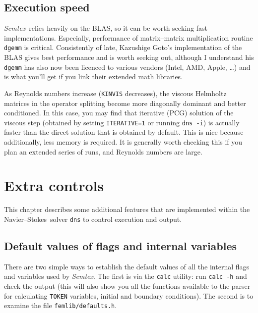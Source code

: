 \documentclass[11pt]{report}
\newcommand{\Semtex}{\emph{Semtex}} \newcommand{\Dog}{\emph{Dog}}
\newcommand\NavSto{Navier--Stokes}
\begin{document}
\section{Execution speed}
\label{sec.speed}

\Semtex\ relies heavily on the BLAS, so it can be worth seeking fast
implementations. Especially, performance of matrix--matrix
multiplication routine \verb+dgemm+ is critical. Consistently of late,
Kazushige Goto's implementation of the BLAS gives best performance and
is worth seeking out, although I understand his \verb+dgemm+ has also
now been licenced to various vendors (Intel, AMD, Apple, \ldots) and
is what you'll get if you link their extended math libraries.

As Reynolds numbers increase (\ie \verb+KINVIS+ decreases), the
viscous Helmholtz matrices in the operator splitting become more
diagonally dominant and better conditioned. In this case, you may find
that iterative (PCG) solution of the viscous step (obtained by setting
\verb|ITERATIVE=1| or running \verb|dns -i|) is actually faster than
the direct solution that is obtained by default. This is nice because
additionally, less memory is required. It is generally worth checking
this if you plan an extended series of runs, and Reynolds numbers are
large.

\chapter{Extra controls}
\label{ch.extra}

This chapter describes some additional features that are implemented
within the \NavSto\ solver \verb+dns+ to control execution and
output.

\section{Default values of flags and internal variables}
\label{sec.default}

There are two simple ways to establish the default values of all the
internal flags and variables used by \Semtex. The first is via
the \verb+calc+ utility: run \verb+calc -h+ and check the output (this
will also show you all the functions available to the parser for
calculating \verb+TOKEN+ variables, initial and boundary
conditions). The second is to examine the file
\verb+femlib/defaults.h+.
\end{document}

